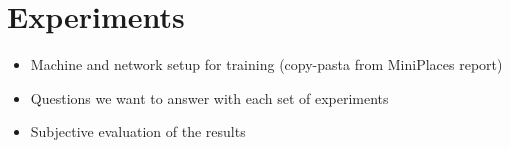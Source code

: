 \section{Experiments}
\label{s:experiments}


\begin{itemize}
\item Machine and network setup for training (copy-pasta from MiniPlaces report)
\item Questions we want to answer with each set of experiments
\item Subjective evaluation of the results
\end{itemize}





